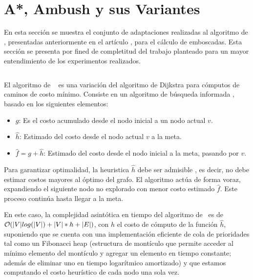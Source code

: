 \section{A*, A\*mbush y sus Variantes}
\label{sec:ambush}

En esta secci\'on se muestra el conjunto de adaptaciones realizadas
al algoritmo de \astar, presentadas anteriormente en el art\'iculo
\cite{FGC12e}, para el c\'alculo de emboscadas. Esta secci\'on se
presenta por fined de completitud del trabajo planteado para un
mayor entendimiento de los experimentos realizados.

\subsection{\astar}

El algoritmo de \astar\ \cite{HNR72}\cite{RN93}\cite{MF09}
es una variación del algoritmo de Dijkstra \cite{CLRS09}
para cómputos de caminos de costo mínimo.
Consiste en un algoritmo de búsqueda informada \cite{RN93},
basado en los siguientes e\-le\-men\-tos:

\begin{itemize}
\item $g$: Es el costo acumulado desde el nodo inicial a un nodo actual $v$.
\item $\hat{h}$: Estimado del costo desde el nodo actual $v$ a la meta.
\item $\hat{f} = g + \hat{h}$: Estimado del costo desde el nodo inicial a la meta, pasando por $v$.
\end{itemize}

Para garantizar optimalidad, la heuristica $\hat{h}$ debe
ser admisible \cite{HNR72}, es decir, no debe estimar
costos mayores al óptimo del grafo.
El algoritmo actúa de forma voraz, expandiendo el 
si\-guien\-te nodo no explorado con menor costo estimado $\hat{f}$.
Este proceso continúa hasta llegar a la meta. 

En este caso, la complejidad asintótica en tiempo
del algoritmo de \astar\ es de $\mathcal{O}(|V|log(|V|) + |V|*h + |E|)$,
con $h$ el costo de cómputo de la función $\hat{h}$,
suponiendo que se cuenta con una implementación eficiente de
cola de prioridades tal como un Fibonacci heap \cite{CLRS09} (estructura
de montículo que permite acceder al mínimo elemento del montículo
y agregar un elemento en tiempo constante; además de
e\-li\-mi\-nar uno en tiempo logarítmico amortizado) y que estamos
computando el costo heurístico de cada nodo una sola vez.

